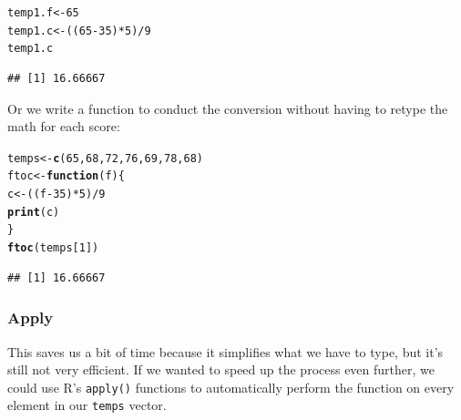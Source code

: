 \documentclass[12pt]{article}\usepackage[]{graphicx}\usepackage[]{color}
\makeatletter
\newcommand{\hlnum}[1]{\textcolor[rgb]{0.686,0.059,0.569}{#1}}%
\newcommand{\hlopt}[1]{\textcolor[rgb]{0,0,0}{#1}}%
\newcommand{\hlstd}[1]{\textcolor[rgb]{0.345,0.345,0.345}{#1}}%
\newcommand{\hlkwa}[1]{\textcolor[rgb]{0.161,0.373,0.58}{\textbf{#1}}}%
\newcommand{\hlkwb}[1]{\textcolor[rgb]{0.69,0.353,0.396}{#1}}%
\newcommand{\hlkwc}[1]{\textcolor[rgb]{0.333,0.667,0.333}{#1}}%
\newcommand{\hlkwd}[1]{\textcolor[rgb]{0.737,0.353,0.396}{\textbf{#1}}}%
\newenvironment{kframe}{%
 \def\at@end@of@kframe{}%
 \ifinner\ifhmode%
  \def\at@end@of@kframe{\end{minipage}}%
  \begin{minipage}{\columnwidth}%
 \fi\fi%
 \def\FrameCommand##1{\hskip\@totalleftmargin \hskip-\fboxsep
 \colorbox{shadecolor}{##1}\hskip-\fboxsep
     \hskip-\linewidth \hskip-\@totalleftmargin \hskip\columnwidth}%
 \MakeFramed {\advance\hsize-\width
   \@totalleftmargin\z@ \linewidth\hsize
   \@setminipage}}%
 {\par\unskip\endMakeFramed%
 \at@end@of@kframe}
\newenvironment{knitrout}{}{} %
\makeatother
\begin{document}
\begin{knitrout}
\color{fgcolor}\begin{kframe}
\begin{alltt}
\hlstd{temp1.f} \hlkwb{<-} \hlnum{65}
\hlstd{temp1.c} \hlkwb{<-} \hlstd{((}\hlnum{65}\hlopt{-}\hlnum{35}\hlstd{)}\hlopt{*}\hlnum{5}\hlstd{)}\hlopt{/}\hlnum{9}
\hlstd{temp1.c}
\end{alltt}
\begin{verbatim}
## [1] 16.66667
\end{verbatim}
\end{kframe}
\end{knitrout}

Or we write a function to conduct the conversion without having to retype the math for each score:

\begin{knitrout}
\color{fgcolor}\begin{kframe}
\begin{alltt}
\hlstd{temps} \hlkwb{<-} \hlkwd{c}\hlstd{(}\hlnum{65}\hlstd{,}\hlnum{68}\hlstd{,}\hlnum{72}\hlstd{,}\hlnum{76}\hlstd{,}\hlnum{69}\hlstd{,}\hlnum{78}\hlstd{,}\hlnum{68}\hlstd{)}
\hlstd{ftoc} \hlkwb{<-} \hlkwa{function}\hlstd{(}\hlkwc{f}\hlstd{) \{}
        \hlstd{c} \hlkwb{<-} \hlstd{((f}\hlopt{-}\hlnum{35}\hlstd{)}\hlopt{*}\hlnum{5}\hlstd{)}\hlopt{/}\hlnum{9}
        \hlkwd{print}\hlstd{(c)}
\hlstd{\}}
\hlkwd{ftoc}\hlstd{(temps[}\hlnum{1}\hlstd{])}
\end{alltt}
\begin{verbatim}
## [1] 16.66667
\end{verbatim}
\end{kframe}
\end{knitrout}

\subsubsection{Apply}
This saves us a bit of time because it simplifies what we have to type, but it's still not very efficient. If we wanted to speed up the process even further, we could use R's \texttt{apply()} functions to automatically perform the function on every element in our \texttt{temps} vector.
\end{document}
